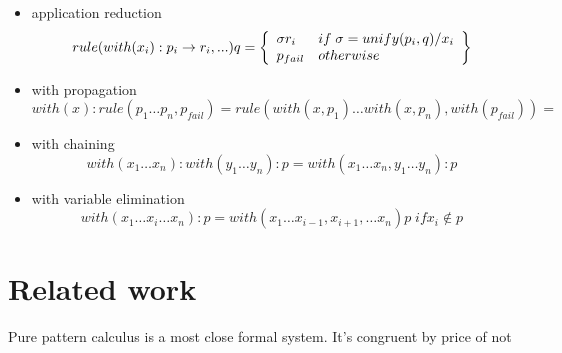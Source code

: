 \documentclass[12pt]{article}
\begin{document}
\begin{itemize}
     \item application reduction
           $$ rule(with(x_i):p_i \to r_i, ... ) q = 
                    \left\{\begin{array}{l l}
                             \sigma r_i & if \;  \sigma=unify(p_i,q)/x_{i} \\
                             p_{fail}   & otherwise \\
                           \end{array}
                    \right\} 
           $$
     \item with propagation
           $$ with(x):rule(p_1 \dots p_{n}, p_{fail}) =
               rule(with(x,p_1) \dots with(x,p_{n}), with(p_{fail})) =
           $$
     \item with chaining
           $$ with(x_1 \dots x_n):with(y_1 \dots y_n):p =
                with(x_1 \dots x_n, y_1 \dots y_n):p $$
     \item with variable elimination
           $$ with(x_{1} \dots x_{i} \dots x_{n}):p = 
              with(x_{1} \dots x_{i-1}, x_{i+1}, \dots x_{n})p \; if x_i \not\in p $$  
\end{itemize}


\section{Related work}

  Pure pattern calculus \cite{Jay05purepattern} is a most close formal system.  It's congruent by 
 price of not 



\end{document}
